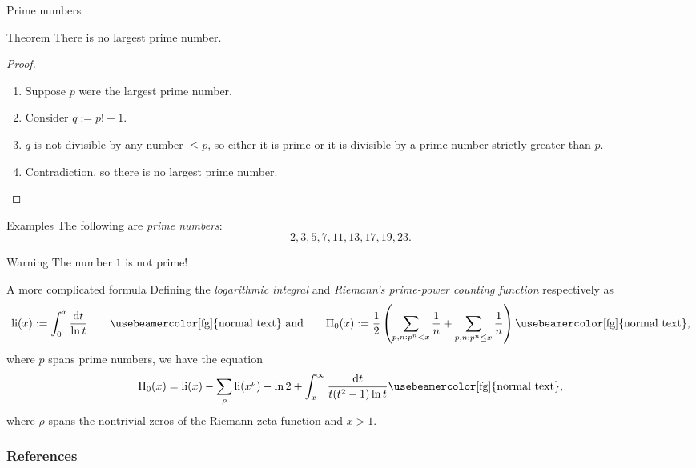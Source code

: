 \documentclass[17pt, t, lualatex]{beamer}
\begin{document}
\begin{frame}{Prime numbers}
\begin{block}{Theorem}
There is no largest prime number.
\end{block}

\begin{proof}
\begin{enumerate}
\item Suppose $p$ were the largest prime number.
\item Consider $q := p! + 1$.
\item $q$ is not divisible by any number $\leq p$, so either it is prime or it is divisible by a prime number strictly greater than $p$.
\item Contradiction, so there is no largest prime number.
\end{enumerate}
\end{proof}
\end{frame}

\begin{frame}
\begin{exampleblock}{Examples}
The following are \emph{prime numbers}:
\[
2, 3, 5, 7, 11, 13, 17, 19, 23.
\]
\end{exampleblock}

\begin{alertblock}{Warning}
The number $1$ is not prime!
\end{alertblock}
\end{frame}

\begin{frame}
\begin{block}{A more complicated formula {\cite{Riemann1859}}}
Defining the \emph{logarithmic integral} and \emph{Riemann's prime-power counting function} respectively as
\[
\textnormal{li}(x) := \int_0^x \frac{\textnormal{d}t}{\ln t}
\qquad \textnormal{\usebeamercolor[fg]{normal text} and} \qquad
\Pi_0(x) := \frac{1}{2} \left( \sum_{p, n: p^n < x} \frac{1}{n} + \sum_{p, n: p^n \leq x} \frac{1}{n} \right) \textnormal{\usebeamercolor[fg]{normal text},}
\]
where $p$ spans prime numbers, we have the equation
\[
\Pi_0(x) = \textnormal{li}(x) - \sum_{\rho} \textnormal{li}(x^\rho) - \ln 2 + \int_x^\infty \frac{\textnormal{d}t}{t (t^2 - 1) \ln t} \textnormal{\usebeamercolor[fg]{normal text},}
\]
where $\rho$ spans the nontrivial zeros of the Riemann zeta function and $x > 1$.
\end{block}
\end{frame}


\begin{frame}
\insertlines
\frametitle{References}


\end{frame}

\insertendpage
\end{document}
